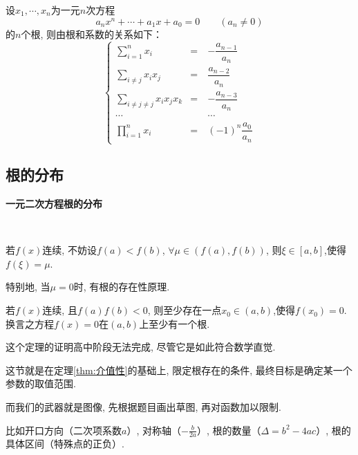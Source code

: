 \begin{theorem}[Vieta定理]
    设\(x_1,\cdots,x_n\)为一元\(n\)次方程
    \begin{equation}
        a_nx^n+\cdots+a_1x+a_0=0\qquad(a_n\neq0)
    \end{equation}的\(n\)个根, 则由根和系数的关系如下：
    \[
        \left\{
        \begin{array}{ccc}
          \displaystyle\sum_{i=1}^{n}x_i& = &-\dfrac{a_{n-1}}{a_n} \\
          \displaystyle\sum_{i\neq j}x_ix_j   & = &\dfrac{a_{n-2}}{a_n}\\
          \displaystyle\sum_{i\neq j\neq j}x_ix_jx_k&=&-\dfrac{a_{n-3}}{a_n}\\
          \cdots&\quad&\cdots\\
          \displaystyle\prod_{i=1}^{n}x_i&=&(-1)^n\dfrac{a_0}{a_n} 
        \end{array}
        \right.
        \]






\end{theorem}
\clearpage
\subsection{根的分布}
\begin{know}
    \item \textbf{一元二次方程根的分布}
\end{know}
\begin{theorem}[介值性]\label{thm:介值性}
    \ 

    若$f(x)$连续, 不妨设$f(a)<f(b)$, $\forall \mu \in(f(a),f(b))$, 
    则$\xi \in [a,b]$,使得$f(\xi)=\mu$.

    特别地, 当$\mu=0$时, 有根的存在性原理. 

    若$f(x)$连续, 且$f(a)f(b)<0$, 则至少存在一点$x_0 \in (a,b)$,使得$f(x_0)=0$. 
    换言之方程$f(x)=0$在$(a,b)$上至少有一个根. 
\end{theorem}
\begin{zhu}
    这个定理的证明高中阶段无法完成, 尽管它是如此符合数学直觉. 
\end{zhu}

这节就是在定理\ref{thm:介值性}的基础上, 限定根存在的条件, 最终目标是确定某一个参数的取值范围. 

而我们的武器就是图像, 先根据题目画出草图, 再对函数加以限制. 

比如开口方向（二次项系数$a$）, 对称轴（$-\frac{b}{2a}$）, 
根的数量（$\Delta=b^2-4ac$）, 根的具体区间（特殊点的正负）. 

